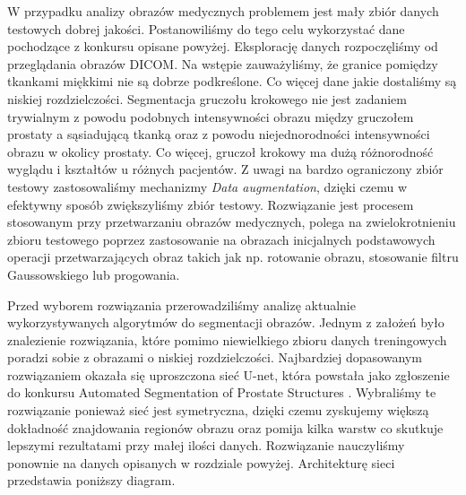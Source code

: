 \documentclass[a4paper,11pt,twoside]{report}
\theoremstyle{definition}
\begin{document}
W przypadku analizy obrazów medycznych problemem jest mały zbiór danych testowych dobrej jakości. Postanowiliśmy do tego celu wykorzystać dane pochodzące z konkursu opisane powyżej. Eksplorację danych rozpoczęliśmy od przeglądania obrazów DICOM. Na wstępie zauważyliśmy, że granice pomiędzy tkankami miękkimi nie są dobrze podkreślone. Co więcej dane jakie dostaliśmy są niskiej rozdzielczości. Segmentacja gruczołu krokowego nie jest zadaniem trywialnym z powodu podobnych intensywności obrazu między gruczołem prostaty a sąsiadującą tkanką oraz z powodu niejednorodności intensywności obrazu w okolicy prostaty. Co więcej, gruczoł krokowy ma dużą różnorodność wyglądu i kształtów u różnych pacjentów.
Z uwagi na bardzo ograniczony zbiór testowy zastosowaliśmy mechanizmy \textit{Data augmentation}, dzięki czemu w efektywny sposób zwiększyliśmy zbiór testowy. Rozwiązanie jest  procesem stosowanym przy przetwarzaniu obrazów medycznych, polega na zwielokrotnieniu zbioru testowego poprzez zastosowanie na obrazach inicjalnych podstawowych operacji przetwarzających obraz takich jak np. rotowanie obrazu, stosowanie filtru Gaussowskiego lub progowania.
\par
Przed wyborem rozwiązania przerowadziliśmy analizę aktualnie wykorzystywanych algorytmów do segmentacji obrazów. Jednym z założeń było znalezienie rozwiązania, które pomimo niewielkiego zbioru danych treningowych poradzi sobie z obrazami o niskiej rozdzielczości. Najbardziej dopasowanym rozwiązaniem okazała się uproszczona sieć U-net, która powstała jako zgłoszenie do konkursu Automated Segmentation of Prostate Structures \cite{zgloszenie}. Wybraliśmy te rozwiązanie ponieważ sieć jest symetryczna, dzięki czemu zyskujemy większą dokładność znajdowania regionów obrazu oraz pomija kilka warstw co skutkuje lepszymi rezultatami przy małej ilości danych. Rozwiązanie nauczyliśmy ponownie na danych opisanych w rozdziale powyżej. Architekturę sieci przedstawia poniższy diagram. 
\end{document}
